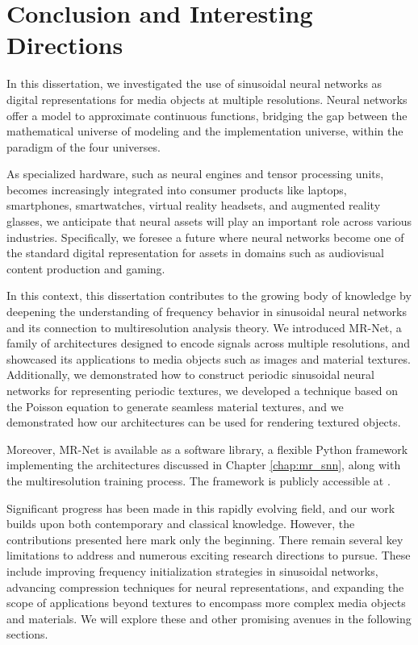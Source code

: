 \chapter{Conclusion and Interesting Directions}
\label{chap:future}

In this dissertation, we investigated the use of sinusoidal neural networks as digital representations for media objects at multiple resolutions. Neural networks offer a model to approximate continuous functions, bridging the gap between the mathematical universe of modeling and the implementation universe, within the paradigm of the four universes. 

As specialized hardware, such as neural engines and tensor processing units, becomes increasingly integrated into consumer products like laptops, smartphones, smartwatches, virtual reality headsets, and augmented reality glasses, we anticipate that neural assets will play an important role across various industries. Specifically, we foresee a future where neural networks become one of the standard digital representation for assets in domains such as audiovisual content production and gaming.

In this context, this dissertation contributes to the growing body of knowledge by deepening the understanding of frequency behavior in sinusoidal neural networks and its connection to multiresolution analysis theory. We introduced MR-Net, a family of architectures designed to encode signals across multiple resolutions, and showcased its applications to media objects such as images and material textures. Additionally, we demonstrated how to construct periodic sinusoidal neural networks for representing periodic textures, we developed a technique based on the Poisson equation to generate seamless material textures, and we demonstrated how our architectures can be used for rendering textured objects.

Moreover, MR-Net is available as a software library, a flexible Python framework implementing the architectures discussed in Chapter \ref{chap:mr_snn}, along with the multiresolution training process. The framework is publicly accessible at \cite{mrnetGithub}.


Significant progress has been made in this rapidly evolving field, and our work builds upon both contemporary and classical knowledge. However, the contributions presented here mark only the beginning. There remain several key limitations to address and numerous exciting research directions to pursue. These include improving frequency initialization strategies in sinusoidal networks, advancing compression techniques for neural representations, and expanding the scope of applications beyond textures to encompass more complex media objects and materials. We will explore these and other promising avenues in the following sections.

